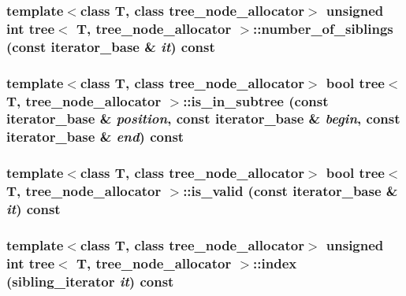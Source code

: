 \hypertarget{classtree_3cddce970c4d44af57cf9ec0d7c3d009}{
\subsubsection{\setlength{\rightskip}{0pt plus 5cm}template$<$class T, class tree\_\-node\_\-allocator$>$ unsigned int {\bf tree}$<$ T, tree\_\-node\_\-allocator $>$::number\_\-of\_\-siblings (const {\bf iterator\_\-base} \& {\em it}) const}}
\label{classtree_3cddce970c4d44af57cf9ec0d7c3d009}


\hypertarget{classtree_825e2106781e846bdd8732c117dc21db}{
\subsubsection{\setlength{\rightskip}{0pt plus 5cm}template$<$class T, class tree\_\-node\_\-allocator$>$ bool {\bf tree}$<$ T, tree\_\-node\_\-allocator $>$::is\_\-in\_\-subtree (const {\bf iterator\_\-base} \& {\em position}, \/  const {\bf iterator\_\-base} \& {\em begin}, \/  const {\bf iterator\_\-base} \& {\em end}) const}}
\label{classtree_825e2106781e846bdd8732c117dc21db}


\hypertarget{classtree_9605b028195248894dc8cf506cd256e3}{
\subsubsection{\setlength{\rightskip}{0pt plus 5cm}template$<$class T, class tree\_\-node\_\-allocator$>$ bool {\bf tree}$<$ T, tree\_\-node\_\-allocator $>$::is\_\-valid (const {\bf iterator\_\-base} \& {\em it}) const}}
\label{classtree_9605b028195248894dc8cf506cd256e3}


\hypertarget{classtree_de5ec1ba55f94165062e50d01ec35d86}{
\subsubsection{\setlength{\rightskip}{0pt plus 5cm}template$<$class T, class tree\_\-node\_\-allocator$>$ unsigned int {\bf tree}$<$ T, tree\_\-node\_\-allocator $>$::index ({\bf sibling\_\-iterator} {\em it}) const}}
\label{classtree_de5ec1ba55f94165062e50d01ec35d86}


